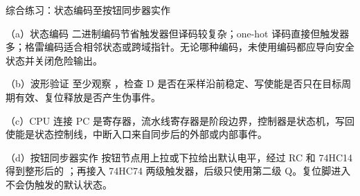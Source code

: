 \begin{chapteranswer}{综合练习：状态编码至按钮同步器实作}
\begin{answersubproblem}{（a）状态编码}
二进制编码节省触发器但译码较复杂；one-hot 译码直接但触发器多；格雷编码适合相邻状态或跨域指针。无论哪种编码，未使用编码都应导向安全状态并关闭危险输出。
\end{answersubproblem}
\begin{answersubproblem}{（b）波形验证}
至少观察 ，检查 D 是否在采样沿前稳定、写使能是否只在目标周期有效、复位释放是否产生伪事件。
\end{answersubproblem}
\begin{answersubproblem}{（c）CPU 连接}
PC 是寄存器，流水线寄存器是阶段边界，控制器是状态机，写回使能是状态控制线，中断入口来自同步后的外部或内部事件。
\end{answersubproblem}
\begin{answersubproblem}{（d）按钮同步器实作}
按钮节点用上拉或下拉给出默认电平，经过 RC 和 74HC14 得到整形后的 ；再接入 74HC74 两级触发器，后级只使用第二级 Q。复位脚进入不会伪触发的默认状态。
\end{answersubproblem}
\end{chapteranswer}

